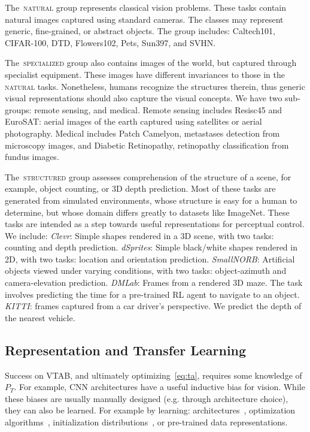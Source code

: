 \documentclass{article}
\def\t{T}
\DeclareRobustCommand{\taskNatural}{\raisebox{0.5pt}{\tikz{\fill[natural] (0cm,0cm) circle (.5ex);}}\,\textsc{natural}}
\DeclareRobustCommand{\taskSpecialized}{\raisebox{0.5pt}{\tikz{\fill[specialized] (0,0) circle (.5ex);}}\,\textsc{specialized}}
\DeclareRobustCommand{\taskStructured}{\raisebox{0.5pt}{\tikz{\fill[structured] (0,0) circle (.5ex);}}\,\textsc{structured}}
\newcommand{\imagenet}{ImageNet}
\begin{document}
The \taskNatural{} group represents classical vision problems.
These tasks contain natural images captured using standard cameras.
The classes may represent generic, fine-grained, or abstract objects.
The group includes: Caltech101, CIFAR-100, DTD, Flowers102, Pets, Sun397, and SVHN.

The \taskSpecialized{} group also contains images of the world, but captured through specialist equipment.
These images have different invariances to those in the \taskNatural{} tasks.
Nonetheless, humans recognize the structures therein, thus generic visual representations should also capture the visual concepts.
We have two sub-groups: remote sensing, and medical.
Remote sensing includes Resisc45 and EuroSAT: aerial images of the earth captured using satellites or aerial photography.
Medical includes Patch Camelyon, metastases detection from microscopy images, and Diabetic Retinopathy, retinopathy classification from fundus images.

The \taskStructured{} group assesses comprehension of the structure of a scene, for example, object counting, or 3D depth prediction.
Most of these tasks are generated from simulated environments, whose structure is easy for a human to determine, but whose domain differs greatly to datasets like \imagenet{}.
These tasks are intended as a step towards useful representations for perceptual control.
We include:
\emph{Clevr}: Simple shapes rendered in a 3D scene, with two tasks: counting and depth prediction.
\emph{dSprites}: Simple black/white shapes rendered in 2D, with two tasks: location and orientation prediction.
\emph{SmallNORB}: Artificial objects viewed under varying conditions, with two tasks: object-azimuth and camera-elevation prediction.
\emph{DMLab}: Frames from a rendered 3D maze. The task involves predicting the time for a pre-trained RL agent to navigate to an object.
\emph{KITTI}: frames captured from a car driver's perspective.
We predict the depth of the nearest vehicle.

\subsection{Representation and Transfer Learning}

Success on VTAB, and ultimately optimizing~\cref{eq:ta}, requires some knowledge of $P_{\t}$.
For example, CNN architectures have a useful inductive bias for vision.
While these biases are usually manually designed (e.g. through architecture choice), they can also be learned.
For example by learning: architectures~\citet{zoph2017}, optimization algorithms~\citet{bello2017neural}, initialization distributions~\citet{raghu2019},
or pre-trained data representations.
\end{document}
